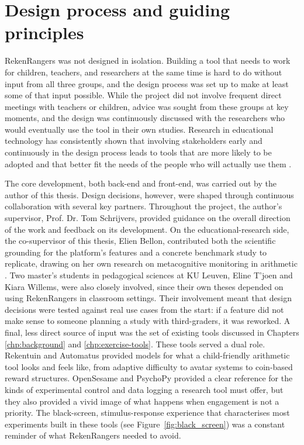 \section{Design process and guiding principles}
RekenRangers was not designed in isolation. Building a tool that needs to work for children, teachers, and researchers at the same time is hard to do without input from all three groups, and the design process was set up to make at least some of that input possible. While the project did not involve frequent direct meetings with teachers or children, advice was sought from these groups at key moments, and the design was continuously discussed with the researchers who would eventually use the tool in their own studies. Research in educational technology has consistently shown that involving stakeholders early and continuously in the design process leads to tools that are more likely to be adopted and that better fit the needs of the people who will actually use them \cite{cumbo2022participatory}.

The core development, both back-end and front-end, was carried out by the author of this thesis. Design decisions, however, were shaped through continuous collaboration with several key partners. Throughout the project, the author's supervisor, Prof. Dr. Tom Schrijvers, provided guidance on the overall direction of the work and feedback on its development. On the educational-research side, the co-supervisor of this thesis, Elien Bellon, contributed both the scientific grounding for the platform's features and a concrete benchmark study to replicate, drawing on her own research on metacognitive monitoring in arithmetic \cite{bellon_more_2019, bellon2020, bellon2021}. Two master's students in pedagogical sciences at KU Leuven, Eline T'joen and Kiara Willems, were also closely involved, since their own theses depended on using RekenRangers in classroom settings. Their involvement meant that design decisions were tested against real use cases from the start: if a feature did not make sense to someone planning a study with third-graders, it was reworked. A final, less direct source of input was the set of existing tools discussed in Chapters \ref{chp:background} and \ref{chp:exercise-tools}. These tools served a dual role. Rekentuin and Automatus provided models for what a child-friendly arithmetic tool looks and feels like, from adaptive difficulty to avatar systems to coin-based reward structures. OpenSesame and PsychoPy provided a clear reference for the kinds of experimental control and data logging a research tool must offer, but they also provided a vivid image of what happens when engagement is not a priority. The black-screen, stimulus-response experience that characterises most experiments built in these tools (see Figure~\ref{fig:black_screen}) was a constant reminder of what RekenRangers needed to avoid.

